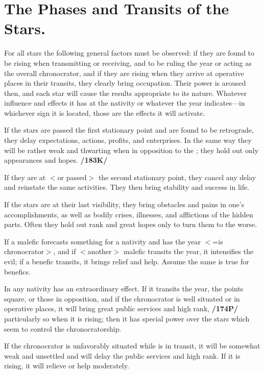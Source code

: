 \section{The Phases and Transits of the Stars.}

For all stars the following general factors must be observed: if they are found to be rising when transmitting or receiving, and to be ruling the year or acting as the overall chronocrator, and if they are rising when they arrive at operative places in their transits, they clearly bring occupation. Their power is aroused then, and each star will cause the results appropriate to its nature. Whatever influence and effects it has at the nativity or whatever the year indicates—in whichever sign it is located, those are the effects it will activate.

If the stars are passed the first stationary point and are found to be retrograde, they delay expectations, actions, profits, and enterprises. In the same way they will be rather weak and thwarting when in opposition to the \Sun; they hold out only appearances and hopes. \textbf{/183K/} 

If they are at $<$or passed$>$ the second stationary point, they cancel any delay and reinstate the same activities. They then bring stability and success in life. 

If the stars are at their last visibility, they bring obstacles and pains in one’s accomplishments, as well as bodily crises, illnesses, and afflictions of the hidden parts. Often they hold
out rank and great hopes only to turn them to the worse. 

If a malefic forecasts something for a nativity and has the year $<$=is chronocrator$>$, and if $<$another$>$ malefic transits the year, it intensifies the evil; if a benefic
transits, it brings relief and help. Assume the same is true for benefics.

In any nativity \Jupiter\xspace has an extraordinary effect. If it transits the year, the points square, or those in opposition, and if the chronocrator is well situated or in operative places, it will bring great public services
and high rank, \textbf{/174P/} particularly so when it is rising; then it has special power over the stars which seem
to control the chronocratorship. 

If the chronocrator is unfavorably situated while \Jupiter\xspace is in transit, it will be somewhat weak and unsettled and will delay the public services and high rank. If it is rising, it will relieve or help moderately.

\newpage
